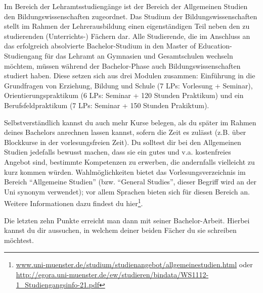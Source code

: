 Im Bereich der Lehramtsstudiengänge ist der Bereich der Allgemeinen Studien den Bildungswissenschaften zugeordnet. Das Studium der Bildungswissenschaften stellt im Rahmen der Lehrerausbildung einen eigenständigen Teil neben den zu studierenden (Unterrichts-) Fächern dar. Alle Studierende, die im Anschluss an das erfolgreich absolvierte Bachelor-Studium in den Master of Education-Studiengang für das Lehramt an Gymnasien und Gesamtschulen wechseln möchtem, müssen während der Bachelor-Phase auch Bildungswissenschaften studiert haben. Diese setzen sich aus drei Modulen zusammen: Einführung in die Grundfragen von Erziehung, Bildung und Schule (7 LPs: Vorlesung + Seminar), Orientierungspraktikum (6 LPs: Seminar + 120 Stunden Praktikum) und ein Berufsfeldpraktikum (7 LPs: Seminar + 150 Stunden Prakiktum).

Selbstverständlich kannst du auch mehr Kurse belegen, als du später im Rahmen deines Bachelors anrechnen lassen kannst, sofern die Zeit es zulässt (z.B. über Blockkurse in der vorlesungsfreien Zeit). Du solltest dir bei den Allgemeinen Studien jedefalls bewusst machen, dass sie ein gutes und v.a. kostenfreies Angebot sind, bestimmte Kompetenzen zu erwerben, die andernfalls vielleicht zu kurz kommen würden.
Wahlmöglichkeiten bietet das Vorlesungsverzeichnis im Bereich \enquote{Allgemeine Studien} (bzw. \enquote{General Studies}, dieser Begriff wird an der Uni synonym verwendet); vor allem Sprachen bieten sich für diesen Bereich an. Weitere Informationen dazu findest du hier\footnote{\url{www.uni-muenster.de/studium/studienangebot/allgemeinestudien.html} oder \url{http://egora.uni-muenster.de/ew/studieren/bindata/WS1112-1_Studiengangsinfo-21.pdf}}.

Die letzten zehn Punkte erreicht man dann mit seiner Bachelor-Arbeit. Hierbei kannst du dir aussuchen, in welchem deiner beiden Fächer du sie schreiben möchtest.

